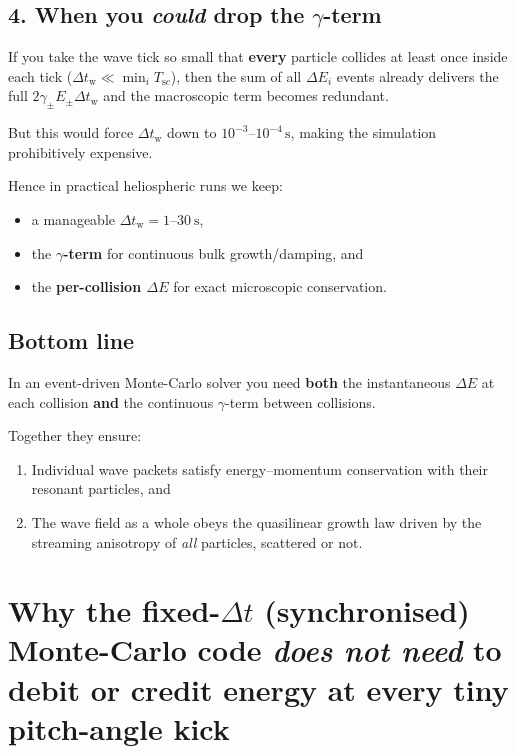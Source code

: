 {\subsection*{4. When you \emph{could} drop the $\gamma$-term}

If you take the wave tick so small that \textbf{every} particle collides at least once inside each tick
($\Delta t_{\mathrm w} \ll \min_i T_{\mathrm sc}$), then the sum of all $\Delta E_i$ events already delivers the full $2\gamma_\pm E_\pm \Delta t_{\mathrm w}$ and the macroscopic term becomes redundant.

But this would force $\Delta t_{\mathrm w}$ down to $10^{-3}$–$10^{-4}\,\mathrm{s}$, making the simulation prohibitively expensive.

Hence in practical heliospheric runs we keep:
\begin{itemize}
  \item a manageable $\Delta t_{\mathrm w} = 1$–$30\ \mathrm{s}$,
  \item the \textbf{$\gamma$-term} for continuous bulk growth/damping, and
  \item the \textbf{per-collision $\Delta E$} for exact microscopic conservation.
\end{itemize}

\subsection*{Bottom line}

In an event-driven Monte-Carlo solver you need \textbf{both} the instantaneous $\Delta E$ at each collision \textbf{and} the continuous $\gamma$-term between collisions.

Together they ensure:
\begin{enumerate}
  \item Individual wave packets satisfy energy–momentum conservation with their resonant particles, and
  \item The wave field as a whole obeys the quasilinear growth law driven by the streaming anisotropy of \emph{all} particles, scattered or not.
\end{enumerate}

\section*{Why the fixed-\texorpdfstring{$\Delta t$}{Δt} (synchronised) Monte-Carlo code \emph{does not need} to debit or credit energy at every tiny pitch-angle kick}

}
